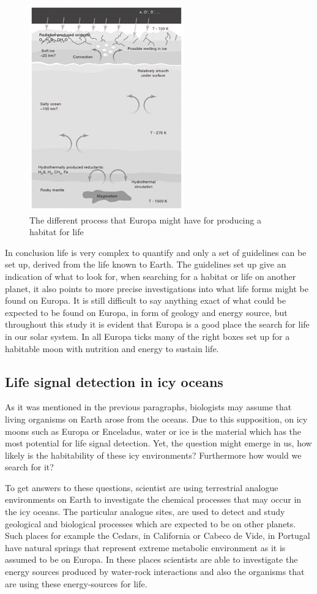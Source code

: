\begin{figure}[htb]
  \centering
  \includegraphics[width=.48\textwidth]{figures/Life/Europasurface}
  \caption{The different process that Europa might have for producing a habitat for life\cite{LifeBeyondEarth}}
  \label{fig:EuropaFromSurfaceToRockcore}
\end{figure}

In conclusion life is very complex to quantify and only a set of guidelines can be set up, derived from the life known to Earth. The guidelines set up give an indication of what to look for, when searching for a habitat or life on another planet, it also points to more precise investigations into what life forms might be found on Europa. It is still difficult to say anything exact of what could be expected to be found on Europa, in form of geology and energy source, but throughout this study it is evident that Europa is a good place the search for life in our solar system. In all Europa ticks many of the right boxes set up for a habitable moon with nutrition and energy to sustain life.

\subsection{Life signal detection in icy oceans}
As it was mentioned in the previous paragraphs, biologists may assume that living organisms on Earth arose from the oceans. Due to this supposition, on icy moons such as Europa or Enceladus, water or ice is the material which has the most potential for life signal detection. Yet, the question might emerge in us, how likely is the habitability of these icy environments? Furthermore how would we search for it?

To get answers to these questions, scientist are using terrestrial analogue environments on Earth to investigate the chemical processes that may occur in the icy oceans. The particular analogue sites, are used to detect and study geological and biological processes which are expected to be on other planets. Such places for example the Cedars, in California or Cabeco de Vide, in Portugal have natural springs that represent extreme metabolic environment as it is assumed to be on Europa. In these places scientists are able to investigate the energy sources produced by water-rock interactions and also the organisms that are using these energy-sources for life.

